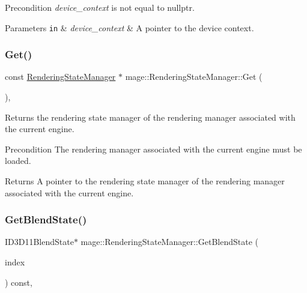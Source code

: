 \begin{DoxyPrecond}{Precondition}
{\itshape device\+\_\+context} is not equal to {\ttfamily nullptr}. 
\end{DoxyPrecond}

\begin{DoxyParams}[1]{Parameters}
\mbox{\tt in}  & {\em device\+\_\+context} & A pointer to the device context. \\
\hline
\end{DoxyParams}
\hypertarget{classmage_1_1_rendering_state_manager_aeea3332b821a6519e81ae7de1cbafecb}{}\label{classmage_1_1_rendering_state_manager_aeea3332b821a6519e81ae7de1cbafecb} 
\subsubsection{\texorpdfstring{Get()}{Get()}}
{\footnotesize\ttfamily const \hyperlink{classmage_1_1_rendering_state_manager}{Rendering\+State\+Manager} $\ast$ mage\+::\+Rendering\+State\+Manager\+::\+Get (\begin{DoxyParamCaption}{ }\end{DoxyParamCaption})\hspace{0.3cm}{\ttfamily [static]}, {\ttfamily [noexcept]}}

Returns the rendering state manager of the rendering manager associated with the current engine.

\begin{DoxyPrecond}{Precondition}
The rendering manager associated with the current engine must be loaded. 
\end{DoxyPrecond}
\begin{DoxyReturn}{Returns}
A pointer to the rendering state manager of the rendering manager associated with the current engine. 
\end{DoxyReturn}
\hypertarget{classmage_1_1_rendering_state_manager_a09dc8e15d98269b1b9c5f9bb71c647b4}{}\label{classmage_1_1_rendering_state_manager_a09dc8e15d98269b1b9c5f9bb71c647b4} 
\subsubsection{\texorpdfstring{Get\+Blend\+State()}{GetBlendState()}}
{\footnotesize\ttfamily I\+D3\+D11\+Blend\+State$\ast$ mage\+::\+Rendering\+State\+Manager\+::\+Get\+Blend\+State (\begin{DoxyParamCaption}\item[{\hyperlink{classmage_1_1_rendering_state_manager_ae8ea18eb352ae4cf9e23b41f10578984}{Blend\+State\+Index}}]{index }\end{DoxyParamCaption}) const\hspace{0.3cm}{\ttfamily [private]}, {\ttfamily [noexcept]}}


